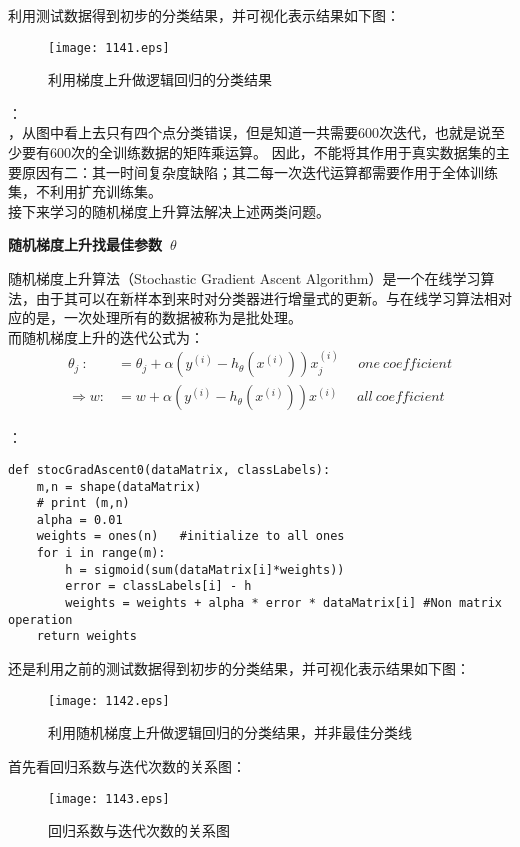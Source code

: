 利用测试数据得到初步的分类结果，并可视化表示结果如下图：
\begin{figure}[!hbt]
  \centering
  \texttt{[image: 1141.eps]}
  \caption{利用梯度上升做逻辑回归的分类结果}
\end{figure}

：\\
，从图中看上去只有四个点分类错误，但是知道一共需要600次迭代，也就是说至少要有600次的全训练数据的矩阵乘运算。
因此，不能将其作用于真实数据集的主要原因有二：其一时间复杂度缺陷；其二每一次迭代运算都需要作用于全体训练集，不利用扩充训练集。\\
接下来学习的随机梯度上升算法解决上述两类问题。

\noindent\textbf{随机梯度上升找最佳参数~$\theta$~}\par
随机梯度上升算法（Stochastic Gradient Ascent Algorithm）是一个在线学习算法，由于其可以在新样本到来时对分类器进行增量式的更新。与在线学习算法相对应的是，一次处理所有的数据被称为是批处理。\\
而随机梯度上升的迭代公式为：
\begin{equation}\nonumber
\begin{split}
  \theta_j ~:&=\theta_j+\alpha(y^{(i)}-h_\theta(x^{(i)}))x_j^{(i)}~~~~~~one~coefficient\\
  \Longrightarrow
  w :&= w+\alpha(y^{(i)}-h_\theta(x^{(i)}))x^{(i)}~~~~~~all~coefficient
\end{split}
\end{equation}

：
\begin{lstlisting}
def stocGradAscent0(dataMatrix, classLabels):
    m,n = shape(dataMatrix)
    # print (m,n)
    alpha = 0.01
    weights = ones(n)   #initialize to all ones
    for i in range(m):
        h = sigmoid(sum(dataMatrix[i]*weights))
        error = classLabels[i] - h
        weights = weights + alpha * error * dataMatrix[i] #Non matrix operation
    return weights
\end{lstlisting}

还是利用之前的测试数据得到初步的分类结果，并可视化表示结果如下图：
\begin{figure}[!hbt]
  \centering
  \texttt{[image: 1142.eps]}
  \caption{利用随机梯度上升做逻辑回归的分类结果，并非最佳分类线}
\end{figure}

首先看回归系数与迭代次数的关系图：
\begin{figure}[!hbt]
  \centering
  \texttt{[image: 1143.eps]}
  \caption{回归系数与迭代次数的关系图}
\end{figure}

